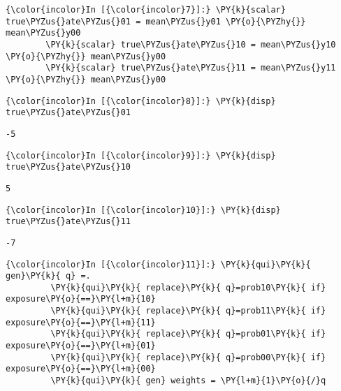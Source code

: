 \documentclass[11pt,notitlepage]{article}\usepackage[]{graphicx}\usepackage[]{color}
\makeatletter
\newenvironment{kframe}{%
 \def\at@end@of@kframe{}%
 \ifinner\ifhmode%
  \def\at@end@of@kframe{\end{minipage}}%
  \begin{minipage}{\columnwidth}%
 \fi\fi%
 \def\FrameCommand##1{\hskip\@totalleftmargin \hskip-\fboxsep
 \colorbox{shadecolor}{##1}\hskip-\fboxsep
     \hskip-\linewidth \hskip-\@totalleftmargin \hskip\columnwidth}%
 \MakeFramed {\advance\hsize-\width
   \@totalleftmargin\z@ \linewidth\hsize
   \@setminipage}}%
 {\par\unskip\endMakeFramed%
 \at@end@of@kframe}
\newenvironment{knitrout}{}{} %
\makeatother
\begin{document}
\begin{enumerate}[a)]
\begin{knitrout}
\begin{kframe}
    \begin{Verbatim}[commandchars=\\\{\}]
{\color{incolor}In [{\color{incolor}7}]:} \PY{k}{scalar} true\PYZus{}ate\PYZus{}01 = mean\PYZus{}y01 \PY{o}{\PYZhy{}} mean\PYZus{}y00
        \PY{k}{scalar} true\PYZus{}ate\PYZus{}10 = mean\PYZus{}y10 \PY{o}{\PYZhy{}} mean\PYZus{}y00
        \PY{k}{scalar} true\PYZus{}ate\PYZus{}11 = mean\PYZus{}y11 \PY{o}{\PYZhy{}} mean\PYZus{}y00
\end{Verbatim}

    \begin{Verbatim}[commandchars=\\\{\}]
{\color{incolor}In [{\color{incolor}8}]:} \PY{k}{disp}  true\PYZus{}ate\PYZus{}01
\end{Verbatim}

    \begin{Verbatim}[commandchars=\\\{\}]
-5
    \end{Verbatim}

    \begin{Verbatim}[commandchars=\\\{\}]
{\color{incolor}In [{\color{incolor}9}]:} \PY{k}{disp}  true\PYZus{}ate\PYZus{}10
\end{Verbatim}

    \begin{Verbatim}[commandchars=\\\{\}]
5
    \end{Verbatim}

    \begin{Verbatim}[commandchars=\\\{\}]
{\color{incolor}In [{\color{incolor}10}]:} \PY{k}{disp}  true\PYZus{}ate\PYZus{}11
\end{Verbatim}

    \begin{Verbatim}[commandchars=\\\{\}]
-7
    \end{Verbatim}

    \begin{Verbatim}[commandchars=\\\{\}]
{\color{incolor}In [{\color{incolor}11}]:} \PY{k}{qui}\PY{k}{ gen}\PY{k}{ q} =.
         \PY{k}{qui}\PY{k}{ replace}\PY{k}{ q}=prob10\PY{k}{ if} exposure\PY{o}{==}\PY{l+m}{10}
         \PY{k}{qui}\PY{k}{ replace}\PY{k}{ q}=prob11\PY{k}{ if} exposure\PY{o}{==}\PY{l+m}{11}
         \PY{k}{qui}\PY{k}{ replace}\PY{k}{ q}=prob01\PY{k}{ if} exposure\PY{o}{==}\PY{l+m}{01}
         \PY{k}{qui}\PY{k}{ replace}\PY{k}{ q}=prob00\PY{k}{ if} exposure\PY{o}{==}\PY{l+m}{00}
         \PY{k}{qui}\PY{k}{ gen} weights = \PY{l+m}{1}\PY{o}{/}q
\end{Verbatim}


\end{kframe}
\end{knitrout}
\end{enumerate}
\end{document}

